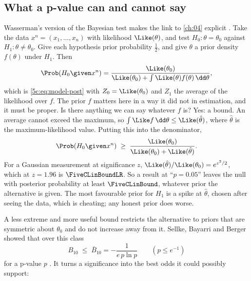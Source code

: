 \subsection{What a p-value can and cannot say}
\label{5c:sec:pvalues}

Wasserman's version of the Bayesian test makes the link to \cref{ch:04} explicit
. Take the data $x^n=(x_1,\dots,x_n)$ with likelihood
$\Like(\theta)$, and test $H_0:\theta=\theta_0$ against $H_1:\theta\ne\theta_0$. Give each
hypothesis prior probability $\tfrac12$, and give $\theta$ a prior density $f(\theta)$
under $H_1$. Then
\begin{equation}
  \Prob(H_0\given x^n)
  =\frac{\Like(\theta_0)}{\Like(\theta_0)+\int\Like(\theta)f(\theta)\,\dd\theta} ,
  \label{5c:eq:aos-test}
\end{equation}
which is \eqref{5c:eq:model-post} with $Z_0=\Like(\theta_0)$ and $Z_1$ the average of the
likelihood over $f$. The prior $f$ matters here in a way it did not in estimation, and it
must be proper. Is there anything we can say whatever $f$ is? Yes: a bound. An average
cannot exceed the maximum, so $\int\Like f\,\dd\theta\le\Like(\hat\theta)$, where
$\hat\theta$ is the maximum-likelihood value. Putting this into the denominator,
\begin{equation}
  \Prob(H_0\given x^n)\;\ge\;\frac{\Like(\theta_0)}{\Like(\theta_0)+\Like(\hat\theta)} .
  \label{5c:eq:aos-bound}
\end{equation}
For a Gaussian measurement at significance $z$, $\Like(\hat\theta)/\Like(\theta_0)=e^{z^2/2}$,
which at $z=1.96$ is $\FiveCLinBoundLR$. So a result at ``$p=0.05$'' leaves the null with
posterior probability at least $\FiveCLinBound$, whatever prior the alternative is given.
The most favourable prior for $H_1$ is a spike at $\hat\theta$, chosen after seeing the
data, which is cheating; any honest prior does worse.

A less extreme and more useful bound restricts the alternative to priors that are
symmetric about $\theta_0$ and do not increase away from it. Sellke, Bayarri and Berger
showed that over this class \cite{Sellke2001}
\begin{equation}
  B_{10}\;\le\;\bar B_{10}=-\frac{1}{e\,p\ln p}\qquad(p\le e^{-1})
  \label{5c:eq:sellke}
\end{equation}
for a p-value $p$ \cite[\S4.5, eq.~(27)]{Trotta2008}. It turns a significance into the
best odds it could possibly support:

